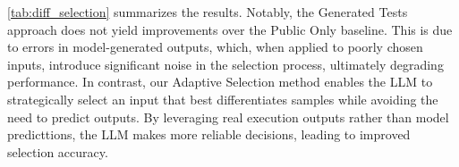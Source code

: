 \cref{tab:diff_selection} summarizes the results. Notably, the Generated Tests approach does not yield improvements over the Public Only baseline. 
This is due to errors in model-generated outputs, which, when applied to poorly chosen inputs, introduce significant noise in the selection process, ultimately degrading performance. 
In contrast, our Adaptive Selection method enables the LLM to strategically select an input that best differentiates samples while avoiding the need to predict outputs. By leveraging real execution outputs rather than model predicttions, the LLM makes more reliable decisions, leading to improved selection accuracy. 



